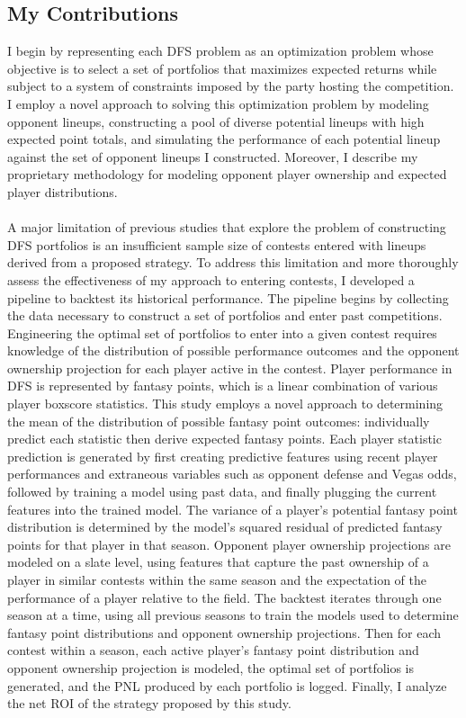 \documentclass{article}
\begin{document}
\subsection{My Contributions}

I begin by representing each DFS problem as an optimization problem whose objective is to select a set of portfolios that maximizes expected returns while subject to a system of constraints imposed by the party hosting the competition. I employ a novel approach to solving this optimization problem by modeling opponent lineups, constructing a pool of diverse potential lineups with high expected point totals, and simulating the performance of each potential lineup against the set of opponent lineups I constructed. Moreover, I describe my proprietary methodology for modeling opponent player ownership and expected player distributions.\\ 
\\
A major limitation of previous studies that explore the problem of constructing DFS portfolios is an insufficient sample size of contests entered with lineups derived from a proposed strategy. To address this limitation and more thoroughly assess the effectiveness of my approach to entering contests, I developed a pipeline to backtest its historical performance. The pipeline begins by collecting the data necessary to construct a set of portfolios and enter past competitions. Engineering the optimal set of portfolios to enter into a given contest requires knowledge of the distribution of possible performance outcomes and the opponent ownership projection for each player active in the contest. Player performance in DFS is represented by fantasy points, which is a linear combination of various player boxscore statistics. This study employs a novel approach to determining the mean of the distribution of possible fantasy point outcomes: individually predict each statistic then derive expected fantasy points. Each player statistic prediction is generated by first creating predictive features using recent player performances and extraneous variables such as opponent defense and Vegas odds, followed by training a model using past data, and finally plugging the current features into the trained model. The variance of a player's potential fantasy point distribution is determined by the model's squared residual of predicted fantasy points for that player in that season. Opponent player ownership projections are modeled on a slate level, using features that capture the past ownership of a player in similar contests within the same season and the expectation of the performance of a player relative to the field. The backtest iterates through one season at a time, using all previous seasons to train the models used to determine fantasy point distributions and opponent ownership projections. Then for each contest within a season, each active player's fantasy point distribution and opponent ownership projection is modeled, the optimal set of portfolios is generated, and the PNL produced by each portfolio is logged. Finally, I analyze the net ROI of the strategy proposed by this study.\\
\end{document}

